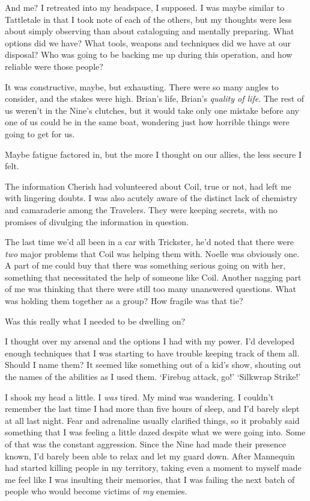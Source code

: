 And me?  I retreated into my headspace, I supposed.  I was maybe similar to Tattletale in that I took note of each of the others, but my thoughts were less about simply observing than about cataloguing and mentally preparing.  What options did we have?  What tools, weapons and techniques did we have at our disposal?  Who was going to be backing me up during this operation, and how reliable were those people?



It was constructive, maybe, but exhausting.  There were so many angles to consider, and the stakes were high.  Brian's life, Brian's \emph{quality of life}.  The rest of us weren't in the Nine's clutches, but it would take only one mistake before any one of us could be in the same boat, wondering just how horrible things were going to get for us.



Maybe fatigue factored in, but the more I thought on our allies, the less secure I felt.



The information Cherish had volunteered about Coil, true or not, had left me with lingering doubts.  I was also acutely aware of the distinct lack of chemistry and camaraderie among the Travelers.  They were keeping secrets, with no promises of divulging the information in question.



The last time we'd all been in a car with Trickster, he'd noted that there were \emph{two} major problems that Coil was helping them with.  Noelle was obviously one.  A part of me could buy that there was something serious going on with her, something that necessitated the help of someone like Coil.  Another nagging part of me was thinking that there were still too many unanswered questions.  What was holding them together as a group?  How fragile was that tie?



Was this really what I needed to be dwelling on?



I thought over my arsenal and the options I had with my power.  I'd developed enough techniques that I was starting to have trouble keeping track of them all.  Should I name them?  It seemed like something out of a kid's show, shouting out the names of the abilities as I used them.  `Firebug attack, go!'  `Silkwrap Strike!'



I shook my head a little.  I \emph{was} tired.  My mind was wandering.  I couldn't remember the last time I had more than five hours of sleep, and I'd barely slept at all last night.  Fear and adrenaline usually clarified things, so it probably said something that I was feeling a little dazed despite what we were going into.  Some of that was the constant aggression.  Since the Nine had made their presence known, I'd barely been able to relax and let my guard down.  After Mannequin had started killing people in my territory, taking even a moment to myself made me feel like I was insulting their memories, that I was failing the next batch of people who would become victims of \emph{my }enemies.



